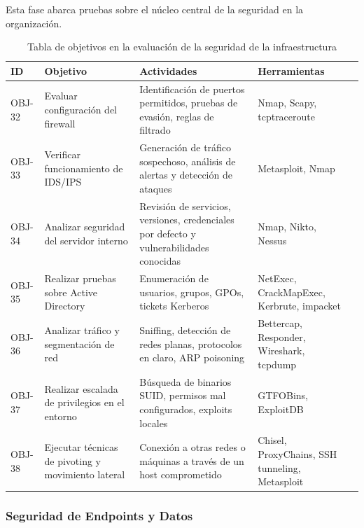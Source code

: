 \documentclass[a4paper, 11pt]{article}
\begin{document}
Esta fase abarca pruebas sobre el núcleo central de la seguridad en la organización.

\begin{table}[H]
\centering
\renewcommand{\arraystretch}{1.4}
\begin{tabular}{|p{1.4cm}|p{4.2cm}|p{4.8cm}|p{3.8cm}|p{2.3cm}|}
\hline
\textbf{ID} & \textbf{Objetivo} & \textbf{Actividades} & \textbf{Herramientas}  \\
\hline
OBJ-32 & Evaluar configuración del firewall & Identificación de puertos permitidos, pruebas de evasión, reglas de filtrado & Nmap, Scapy, tcptraceroute  \\
\hline
OBJ-33 & Verificar funcionamiento de IDS/IPS & Generación de tráfico sospechoso, análisis de alertas y detección de ataques & Metasploit, Nmap  \\
\hline
OBJ-34 & Analizar seguridad del servidor interno & Revisión de servicios, versiones, credenciales por defecto y vulnerabilidades conocidas & Nmap, Nikto, Nessus  \\
\hline
OBJ-35 & Realizar pruebas sobre Active Directory & Enumeración de usuarios, grupos, GPOs, tickets Kerberos & NetExec, CrackMapExec, Kerbrute, impacket  \\
\hline
OBJ-36 & Analizar tráfico y segmentación de red & Sniffing, detección de redes planas, protocolos en claro, ARP poisoning & Bettercap, Responder, Wireshark, tcpdump  \\
\hline
OBJ-37 & Realizar escalada de privilegios en el entorno & Búsqueda de binarios SUID, permisos mal configurados, exploits locales & GTFOBins, ExploitDB  \\
\hline
OBJ-38 & Ejecutar técnicas de pivoting y movimiento lateral & Conexión a otras redes o máquinas a través de un host comprometido & Chisel, ProxyChains, SSH tunneling, Metasploit  \\
\hline
\end{tabular}
\caption{Tabla de objetivos en la evaluación de la seguridad de la infraestructura}
\end{table}


\par\vspace{0.5cm}





\subsubsection{Seguridad de Endpoints y Datos}
\end{document}
